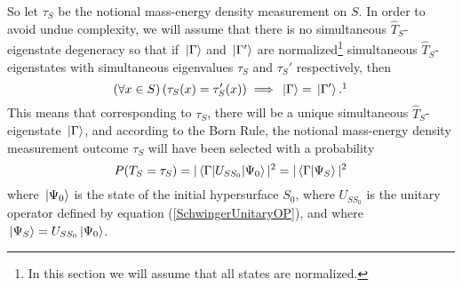 So let $\tau_S$ be the notional mass-energy density measurement on $S$. In order to avoid undue complexity, we will assume that there is no simultaneous $\hat{T}_S$-eigenstate degeneracy so that if $\ket*{\Gamma}$ and $\ket*{\Gamma'}$ are normalized\footnote{In this section we will assume that all states are normalized.} simultaneous $\hat{T}_S$-eigenstates with simultaneous eigenvalues $\tau_S$ and $\tau_S'$ respectively, then
\begin{equation*}
(\forall x\in S) \,(\tau_S(x)=\tau_S'(x))\implies \ket*{\Gamma}=\ket*{\Gamma'}.\protect\footnotemark 
\end{equation*}This means that corresponding to $\tau_S$, there will be a unique simultaneous $\hat{T}_S$-eigenstate $\ket*{\Gamma}$, and according to the Born Rule, the notional mass-energy density measurement outcome $\tau_S$ will have been selected with a probability 
\begin{equation*}
P(T_S = \tau_S)=|\mel{\Gamma}{U_{SS_0}}{\Psi_0}|^2=|\ip{\Gamma}{\Psi_S}|^2
\end{equation*}
where $\ket*{\Psi_0}$ is the state of the initial hypersurface $S_0$, where $U_{SS_0}$ is the unitary operator defined by equation (\ref{SchwingerUnitaryOP}), and where $\ket*{\Psi_S}=U_{SS_0}\ket*{\Psi_0}$.

